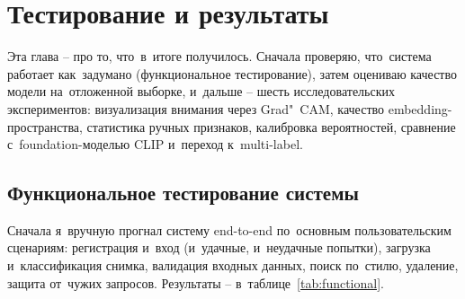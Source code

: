 \documentclass[a4paper,12pt]{diplom}
\begin{document}
\chapter{Тестирование и результаты}
\label{ch:results}

Эта глава -- про то, что~в~итоге получилось. Сначала проверяю, что~система работает как~задумано (функциональное тестирование), затем оцениваю качество модели на~отложенной выборке, и~дальше -- шесть исследовательских экспериментов: визуализация внимания через Grad"~CAM, качество embedding-пространства, статистика ручных признаков, калибровка вероятностей, сравнение с~foundation-моделью CLIP и~переход к~multi-label.

\section{Функциональное тестирование системы}
\label{sec:functional}

Сначала я~вручную прогнал систему end-to-end по~основным пользовательским сценариям: регистрация и~вход (и~удачные, и~неудачные попытки), загрузка и~классификация снимка, валидация входных данных, поиск по~стилю, удаление, защита от~чужих запросов. Результаты -- в~таблице~\ref{tab:functional}.
\end{document}
